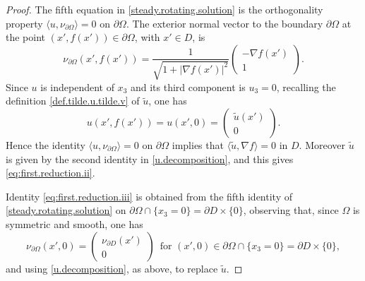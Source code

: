 \documentclass[10pt,reqno,a4paper]{article}
\numberwithin{equation}{section}
\theoremstyle{plain}
\theoremstyle{definition}
\newcommand{\mJ}{\mathcal{J}}
\newcommand{\Om}{\Omega}
\newcommand{\la}{\langle}
\newcommand{\ra}{\rangle}
\newcommand{\pa}{\partial}
\newcommand{\grad}{\nabla}
\begin{document}
\begin{proof}
The fifth equation in \eqref{steady.rotating.solution} 
is the orthogonality property $\la u, \nu_{\pa\Om}\ra=0$ on $\pa \Omega$. 
The exterior normal vector to the boundary $\pa \Omega$ 
at the point $(x',f(x')) \in \pa \Om$, with $x'\in D$, is 
\begin{equation} \label{normal.pa.Om.f}
\nu_{\pa \Om} (x',f(x'))=
\frac{1}{\sqrt{1+|\nabla f(x')|^2}} \begin{pmatrix} - \nabla f(x') \\ 1 \end{pmatrix}.
\end{equation}
Since $u$ is independent of $x_3$ and its third component is $u_3 = 0$, 
recalling the definition \eqref{def.tilde.u.tilde.v} of $\tilde u$, one has 
\[
u(x', f(x')) = u(x',0) = \begin{pmatrix} \tilde u(x') \\ 0 \end{pmatrix}.
\]
Hence the identity $\la u, \nu_{\pa \Omega} \ra = 0$ on $\pa \Omega$ 
implies that $\la \tilde u, \grad f \ra = 0$ in $D$. 
Moreover $\tilde u$ is given by the second identity in \eqref{u.decomposition}, 
and this gives \eqref{eq:first.reduction.ii}.


Identity \eqref{eq:first.reduction.iii} is obtained from the fifth identity 
of \eqref{steady.rotating.solution} on $\pa \Omega \cap \{x_3=0\} = \pa D \times \{0\}$, 
observing that, since $\Omega$ is symmetric and smooth, one has
\begin{equation} \label{normal.at.pa.D}
\nu_{\pa \Omega}(x',0)=
\begin{pmatrix} 
\nu_{\pa D}(x')
\\
0
\end{pmatrix} \,\,\, \text{for } (x',0) \in \pa \Omega \cap \{x_3=0\}=\pa D \times \{0\},
\end{equation}
and using \eqref{u.decomposition}, as above, to replace $\tilde u$. 
\end{proof} 
\end{document}
